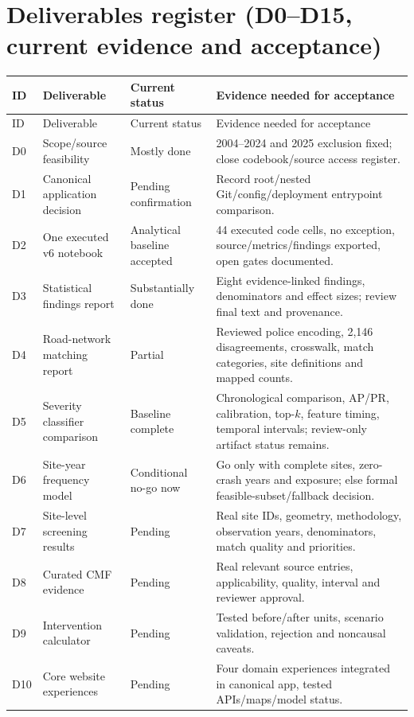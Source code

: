 \documentclass[11pt,a4paper,openany]{report}
\begin{document}
\section{Deliverables register (D0--D15, current evidence and acceptance)}
\small
\begin{longtable}{@{}L{10mm}L{42mm}L{29mm}L{62mm}@{}}\toprule ID & Deliverable & Current status & Evidence needed for acceptance\\\midrule\endfirsthead
\toprule ID & Deliverable & Current status & Evidence needed for acceptance\\\midrule\endhead
D0 & Scope/source feasibility & Mostly done & 2004--2024 and 2025 exclusion fixed; close codebook/source access register.\\
D1 & Canonical application decision & Pending confirmation & Record root/nested Git/config/deployment entrypoint comparison.\\
D2 & One executed v6 notebook & Analytical baseline accepted & 44 executed code cells, no exception, source/metrics/findings exported, open gates documented.\\
D3 & Statistical findings report & Substantially done & Eight evidence-linked findings, denominators and effect sizes; review final text and provenance.\\
D4 & Road-network matching report & Partial & Reviewed police encoding, 2,146 disagreements, crosswalk, match categories, site definitions and mapped counts.\\
D5 & Severity classifier comparison & Baseline complete & Chronological comparison, AP/PR, calibration, top-$k$, feature timing, temporal intervals; review-only artifact status remains.\\
D6 & Site-year frequency model & Conditional no-go now & Go only with complete sites, zero-crash years and exposure; else formal feasible-subset/fallback decision.\\
D7 & Site-level screening results & Pending & Real site IDs, geometry, methodology, observation years, denominators, match quality and priorities.\\
D8 & Curated CMF evidence & Pending & Real relevant source entries, applicability, quality, interval and reviewer approval.\\
D9 & Intervention calculator & Pending & Tested before/after units, scenario validation, rejection and noncausal caveats.\\
D10 & Core website experiences & Pending & Four domain experiences integrated in canonical app, tested APIs/maps/model status.\\

\end{longtable}
\end{document}
